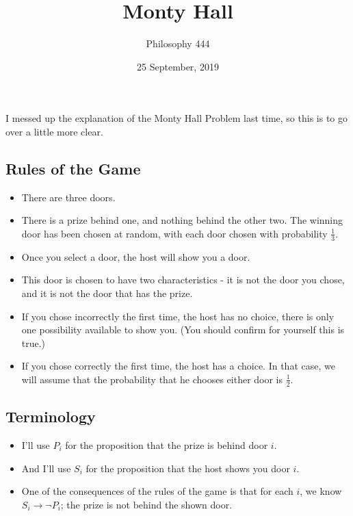 \documentclass[11pt,]{article}
\title{Monty Hall}
\author{Philosophy 444}
\date{25 September, 2019}
\providecommand{\tightlist}{%
  \setlength{\itemsep}{0pt}\setlength{\parskip}{0pt}}
\begin{document}
\maketitle

I messed up the explanation of the Monty Hall Problem last time, so this
is to go over a little more clear.

\hypertarget{rules-of-the-game}{%
\subsection{Rules of the Game}\label{rules-of-the-game}}

\begin{itemize}
\tightlist
\item
  There are three doors.
\item
  There is a prize behind one, and nothing behind the other two. The
  winning door has been chosen at random, with each door chosen with
  probability \(\frac{1}{3}\).
\item
  Once you select a door, the host will show you a door.
\item
  This door is chosen to have two characteristics - it is not the door
  you chose, and it is not the door that has the prize.
\item
  If you chose incorrectly the first time, the host has no choice, there
  is only one possibility available to show you. (You should confirm for
  yourself this is true.)
\item
  If you chose correctly the first time, the host has a choice. In that
  case, we will assume that the probability that he chooses either door
  is \(\frac{1}{2}\).
\end{itemize}

\hypertarget{terminology}{%
\subsection{Terminology}\label{terminology}}

\begin{itemize}
\tightlist
\item
  I'll use \(P_i\) for the proposition that the prize is behind door
  \(i\).
\item
  And I'll use \(S_i\) for the proposition that the host shows you door
  \(i\).
\item
  One of the consequences of the rules of the game is that for each
  \(i\), we know \(S_i \rightarrow \neg P_i\); the prize is not behind
  the shown door.
\end{itemize}
\end{document}
